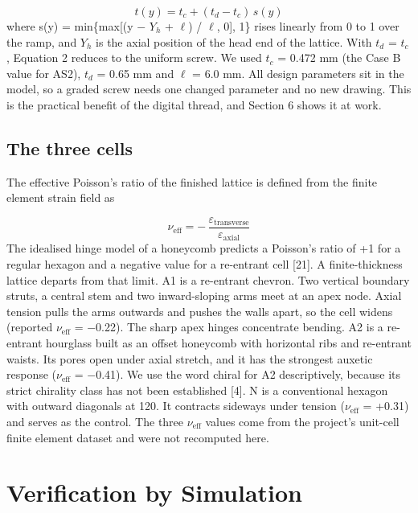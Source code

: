 \documentclass[10pt,twocolumn,letterpaper]{article}
\begin{document}
\begin{equation}t(y) = t_c + (t_d - t_c)\,s(y)\end{equation}
where s(y) = min\{max[(y $-$ $Y_{h}$ + $\ell$) / $\ell$, 0], 1\} rises linearly from 0 to 1 over the ramp, and $Y_{h}$ is the axial position of the head end of the lattice. With $t_{d}$ = $t_{c}$, Equation 2 reduces to the uniform screw. We used $t_{c}$ = 0.472 mm (the Case B value for AS2), $t_{d}$ = 0.65 mm and $\ell$ = 6.0 mm. All design parameters sit in the model, so a graded screw needs one changed parameter and no new drawing. This is the practical benefit of the digital thread, and Section 6 shows it at work.

\subsection{The three cells}
The effective Poisson's ratio of the finished lattice is defined from the finite element strain field as

\begin{equation}\nu_{\mathrm{eff}} = -\,\frac{\varepsilon_{\mathrm{transverse}}}{\varepsilon_{\mathrm{axial}}}\end{equation}
The idealised hinge model of a honeycomb predicts a Poisson's ratio of +1 for a regular hexagon and a negative value for a re-entrant cell [21]. A finite-thickness lattice departs from that limit. A1 is a re-entrant chevron. Two vertical boundary struts, a central stem and two inward-sloping arms meet at an apex node. Axial tension pulls the arms outwards and pushes the walls apart, so the cell widens (reported $\nu_{\mathrm{eff}}$ = $-$0.22). The sharp apex hinges concentrate bending. A2 is a re-entrant hourglass built as an offset honeycomb with horizontal ribs and re-entrant waists. Its pores open under axial stretch, and it has the strongest auxetic response ($\nu_{\mathrm{eff}}$ = $-$0.41). We use the word chiral for A2 descriptively, because its strict chirality class has not been established [4]. N is a conventional hexagon with outward diagonals at 120\textdegree{}. It contracts sideways under tension ($\nu_{\mathrm{eff}}$ = +0.31) and serves as the control. The three $\nu_{\mathrm{eff}}$ values come from the project's unit-cell finite element dataset and were not recomputed here.


\section{Verification by Simulation}
\end{document}
